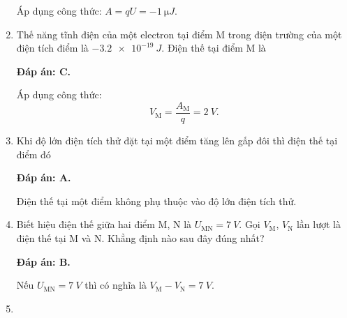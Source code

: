 \begin{enumerate}[label=\bfseries Câu \arabic*:]
{		Áp dụng công thức: $A=qU = \SI{-1}{\micro J}$.
	}
	\item {}
	
	\cauhoi
	{Thế năng tĩnh điện của một electron tại điểm M trong điện trường của một điện tích điểm là $\SI{-3.2e-19}{J}$. Điện thế tại điểm M là
		
	}
	\loigiai
	{	\textbf{Đáp án: C.}
		
		Áp dụng công thức:
		$$V_\text{M} = \dfrac{A_\text{M}}{q} = \SI{2}{V}.$$
	}
	\item {}
	
	\cauhoi
	{Khi độ lớn điện tích thử đặt tại một điểm tăng lên gấp đôi thì điện thế tại điểm đó
		
	}
	\loigiai
	{	\textbf{Đáp án: A.}
		
		Điện thế tại một điểm không phụ thuộc vào độ lớn điện tích thử.
	}
	\item {}
	
	\cauhoi
	{Biết hiệu điện thế giữa hai điểm M, N là $U_\text{MN}=\SI{7}{V}$. Gọi $V_\text{M}$, $V_\text{N}$ lần lượt là điện thế tại M và N. Khẳng định nào sau đây đúng nhất?
		
	}
	\loigiai
	{	\textbf{Đáp án: B.}
		
		Nếu $U_\text{MN} = \SI{7}{V}$ thì có nghĩa là $V_\text{M} - V_\text{N} = \SI{7}{V}$.
	}
	\item {}
	

\end{enumerate}
